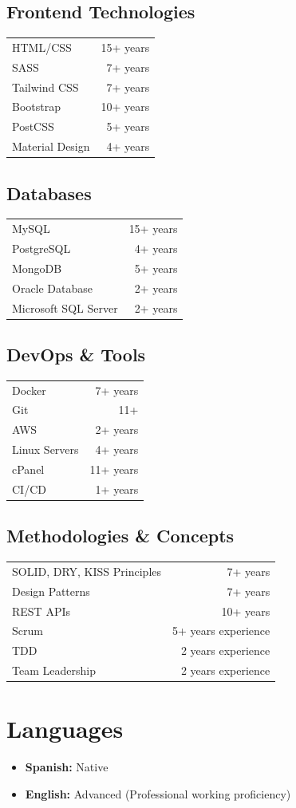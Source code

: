 \documentclass[11pt,a4paper]{article}
\newcommand{\skill}[2]{#1 & #2 \\}
\begin{document}
\subsection*{Frontend Technologies}
\begin{tabularx}{\textwidth}{X r}
\skill{HTML/CSS}{15+ years}
\skill{SASS}{7+ years}
\skill{Tailwind CSS}{7+ years}
\skill{Bootstrap}{10+ years}
\skill{PostCSS}{5+ years}
\skill{Material Design}{4+ years}
\end{tabularx}

\subsection*{Databases}
\begin{tabularx}{\textwidth}{X r}
\skill{MySQL}{15+ years}
\skill{PostgreSQL}{4+ years}
\skill{MongoDB}{5+ years}
\skill{Oracle Database}{2+ years}
\skill{Microsoft SQL Server}{2+ years}
\end{tabularx}

\subsection*{DevOps \& Tools}
\begin{tabularx}{\textwidth}{X r}
\skill{Docker}{7+ years}
\skill{Git}{11+}
\skill{AWS}{2+ years}
\skill{Linux Servers}{4+ years}
\skill{cPanel}{11+ years}
\skill{CI/CD}{1+ years}
\end{tabularx}

\subsection*{Methodologies \& Concepts}
\begin{tabularx}{\textwidth}{X r}
\skill{SOLID, DRY, KISS Principles}{7+ years}
\skill{Design Patterns}{7+ years}
\skill{REST APIs}{10+ years}
\skill{Scrum}{5+ years experience}
\skill{TDD}{2 years experience}
\skill{Team Leadership}{2 years experience}
\end{tabularx}

\section*{Languages}
\begin{itemize}[noitemsep]
  \item \textbf{Spanish:} Native
  \item \textbf{English:} Advanced (Professional working proficiency)
\end{itemize}
\end{document}
